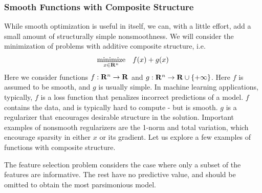 \subsubsection{Smooth Functions with Composite Structure} While smooth
optimization is useful in itself, we can, with a little effort, add a  small
amount of structurally simple nonsmoothness. We will consider the minimization
of problems with additive composite structure, i.e.
\begin{equation}
  \label{eq:minimize_fpg}
  \underset{x\in {\mathbf{R}}^n}{\text{minimize}} \quad f(x) + g(x)
\end{equation}
Here we consider functions $f:\mathbf{R}^n\to\mathbf{R}$ and
$g:\mathbf{R}^n\to\mathbf{R}\cup\{+\infty\}$. Here $f$ is assumed to be smooth, and $g$
is usually simple. In machine learning applications, typically, $f$ is a loss
function that penalizes incorrect predictions of a model. $f$ contains the
data, and is typically hard to compute - but is smooth. $g$ is a regularizer
that encourages desirable structure in the solution. Important examples of
nonsmooth regularizers are the 1-norm and total variation, which encourage
sparsity in either $x$ or its gradient. Let us explore a few examples of functions
with composite structure.

\begin{example} 
The feature selection problem considers the case where
only a subset of the features are informative. The rest have no
predictive value, and should be omitted to obtain the most
parsimonious model. 
\end{example}

\begin{example}
\end{example}

\begin{example}
\end{example}


